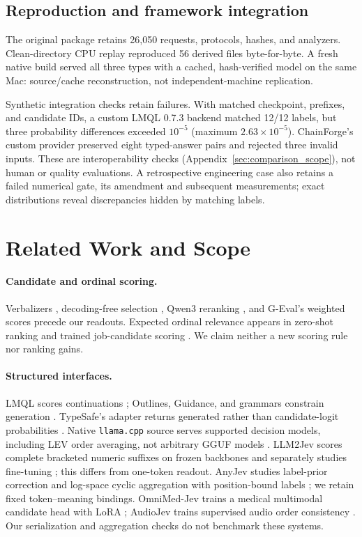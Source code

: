 \documentclass[11pt]{article}
\begin{document}
\subsection{Reproduction and framework integration}
The original package retains 26,050 requests, protocols, hashes, and analyzers. Clean-directory CPU replay reproduced 56 derived files byte-for-byte. A fresh native build served all three types with a cached, hash-verified model on the same Mac: source/cache reconstruction, not independent-machine replication.

Synthetic integration checks retain failures. With matched checkpoint, prefixes, and candidate IDs, a custom LMQL 0.7.3 backend matched 12/12 labels, but three probability differences exceeded $10^{-5}$ (maximum $2.63\times10^{-5}$). ChainForge's custom provider preserved eight typed-answer pairs and rejected three invalid inputs. These are interoperability checks (Appendix~\ref{sec:comparison_scope}), not human or quality evaluations. A retrospective engineering case also retains a failed numerical gate, its amendment and subsequent measurements; exact distributions reveal discrepancies hidden by matching labels.

\section{Related Work and Scope}
\paragraph{Candidate and ordinal scoring.}
Verbalizers \citep{schick2021pet}, decoding-free selection \citep{ma2025inferring}, Qwen3 reranking \citep{zhang2025qwen3embedding,qwen3reranker}, and G-Eval's weighted scores \citep{liu2023geval} precede our readouts. Expected ordinal relevance appears in zero-shot ranking \citep{zhuang2024beyond} and trained job-candidate scoring \citep{wang2026singletoken}. We claim neither a new scoring rule nor ranking gains.

\paragraph{Structured interfaces.}
LMQL scores continuations \citep{lmqlscoring}; Outlines, Guidance, and grammars constrain generation \citep{outlines,guidance,geng2023grammar}. TypeSafe's adapter returns generated rather than candidate-logit probabilities \citep{typesafeadapter}. Native \texttt{llama.cpp} source serves supported decision models, including LEV order averaging, not arbitrary GGUF models \citep{llamacpp2026systemone}. LLM2Jev scores complete bracketed numeric suffixes on frozen backbones and separately studies fine-tuning \citep{li2026llm2jev}; this differs from one-token readout. AnyJev studies label-prior correction and log-space cyclic aggregation with position-bound labels \citep{zhang2026anyjev}; we retain fixed token--meaning bindings. OmniMed-Jev trains a medical multimodal candidate head with LoRA \citep{tang2026omnimedjev}; AudioJev trains supervised audio order consistency \citep{lv2026audiojev}. Our serialization and aggregation checks do not benchmark these systems.
\end{document}
